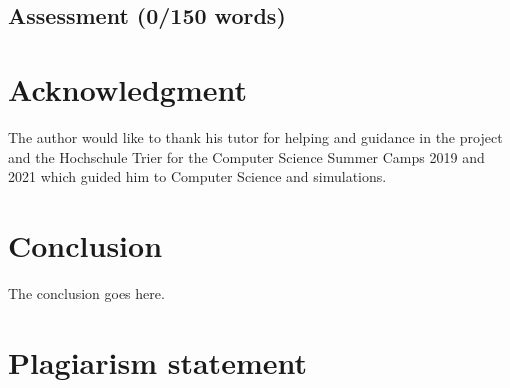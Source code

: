 \documentclass[conference,compsoc]{IEEEtran}
\begin{document}
\subsection{Assessment (0/150 words)}


\section*{Acknowledgment}
The author would like to thank his tutor for helping and guidance in the project and the Hochschule Trier for the Computer Science Summer Camps 2019 and 2021 which guided him to Computer Science and simulations.


\section{Conclusion}
The conclusion goes here.
\section{Plagiarism statement}
\end{document}
